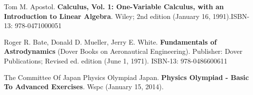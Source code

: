 \documentclass[10pt]{amsart}
\begin{document}
\begin{thebibliography}{9}
Tom M. Apostol. \textbf{Calculus, Vol. 1: One-Variable Calculus, with an Introduction to Linear Algebra}. Wiley; 2nd edition (January 16, 1991).ISBN-13: 978-0471000051

Roger R. Bate, Donald D. Mueller, Jerry E. White. \textbf{Fundamentals of Astrodynamics} (Dover Books on Aeronautical Engineering). Publisher: Dover Publications; Revised ed. edition (June 1, 1971). ISBN-13: 978-0486600611

The Committee Of Japan Physics Olympiad Japan. \textbf{Physics Olympiad - Basic To Advanced Exercises}.
Wspc (January 15, 2014).


\end{thebibliography}
\end{document}
